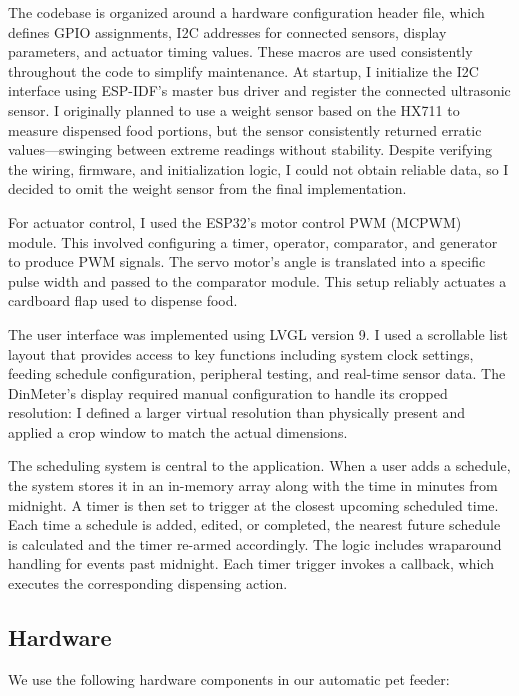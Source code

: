 \documentclass[12pt]{article}
\begin{document}
The codebase is organized around a hardware configuration header file, which defines GPIO assignments, I2C addresses for connected sensors, display parameters, and actuator timing values. These macros are used consistently throughout the code to simplify maintenance. At startup, I initialize the I2C interface using ESP-IDF's master bus driver and register the connected ultrasonic sensor. I originally planned to use a weight sensor based on the HX711 to measure dispensed food portions, but the sensor consistently returned erratic values---swinging between extreme readings without stability. Despite verifying the wiring, firmware, and initialization logic, I could not obtain reliable data, so I decided to omit the weight sensor from the final implementation.

For actuator control, I used the ESP32's motor control PWM (MCPWM) module. This involved configuring a timer, operator, comparator, and generator to produce PWM signals. The servo motor's angle is translated into a specific pulse width and passed to the comparator module. This setup reliably actuates a cardboard flap used to dispense food.

The user interface was implemented using LVGL version 9. I used a scrollable list layout that provides access to key functions including system clock settings, feeding schedule configuration, peripheral testing, and real-time sensor data. The DinMeter's display required manual configuration to handle its cropped resolution: I defined a larger virtual resolution than physically present and applied a crop window to match the actual dimensions.

The scheduling system is central to the application. When a user adds a schedule, the system stores it in an in-memory array along with the time in minutes from midnight. A timer is then set to trigger at the closest upcoming scheduled time. Each time a schedule is added, edited, or completed, the nearest future schedule is calculated and the timer re-armed accordingly. The logic includes wraparound handling for events past midnight. Each timer trigger invokes a callback, which executes the corresponding dispensing action.
\subsection{Hardware}
We use the following hardware components in our automatic pet feeder:
\end{document}
